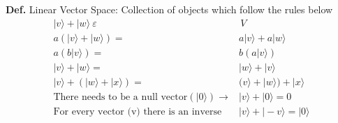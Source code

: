\documentclass[12pt]{article}
\begin{document}
\textbf{Def.} Linear Vector Space: Collection of objects which follow the rules below
\begin{align*}
|v\rangle + |w\rangle \ \varepsilon& \, V
\\
a(|v\rangle + |w\rangle) =& a|v\rangle + a|w\rangle
\\
a(b|v\rangle) =& b(a|v\rangle)
\\
|v\rangle + |w\rangle =& |w\rangle + |v\rangle
\\
|v\rangle + (|w\rangle + |x\rangle) =& 
(v\rangle + |w\rangle) + |x\rangle
\\
\text{There needs to be a null vector} (|0\rangle) \rightarrow& |v\rangle + |0\rangle = 0 
\\
\text{For every vector (v) there is an inverse} &
|v\rangle + |-v\rangle = |0\rangle
\end{align*}
\end{document}
